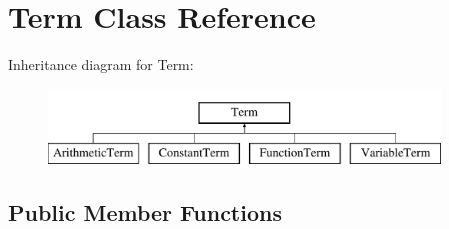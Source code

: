 \hypertarget{classTerm}{\section{\-Term \-Class \-Reference}
\label{classTerm}
}
\-Inheritance diagram for \-Term\-:\begin{figure}[H]
\begin{center}
\leavevmode
\includegraphics[height=2.000000cm]{classTerm}
\end{center}
\end{figure}
\subsection*{\-Public \-Member \-Functions}

